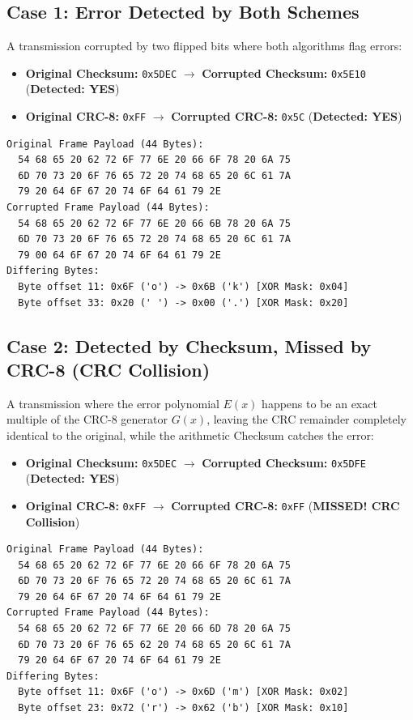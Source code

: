 \documentclass[11pt,a4paper]{article}
\begin{document}
\subsection{Case 1: Error Detected by Both Schemes}
A transmission corrupted by two flipped bits where both algorithms flag errors:
\begin{itemize}
    \item \textbf{Original Checksum:} \texttt{0x5DEC} $\longrightarrow$ \textbf{Corrupted Checksum:} \texttt{0x5E10} (\textbf{Detected: YES})
    \item \textbf{Original CRC-8:} \texttt{0xFF} $\longrightarrow$ \textbf{Corrupted CRC-8:} \texttt{0x5C} (\textbf{Detected: YES})
\end{itemize}
\begin{lstlisting}[style=hexstyle, caption={Case 1 Payload Hex Dumps and Differing Bytes}]
Original Frame Payload (44 Bytes):
  54 68 65 20 62 72 6F 77 6E 20 66 6F 78 20 6A 75 
  6D 70 73 20 6F 76 65 72 20 74 68 65 20 6C 61 7A 
  79 20 64 6F 67 20 74 6F 64 61 79 2E 
Corrupted Frame Payload (44 Bytes):
  54 68 65 20 62 72 6F 77 6E 20 66 6B 78 20 6A 75 
  6D 70 73 20 6F 76 65 72 20 74 68 65 20 6C 61 7A 
  79 00 64 6F 67 20 74 6F 64 61 79 2E 
Differing Bytes:
  Byte offset 11: 0x6F ('o') -> 0x6B ('k') [XOR Mask: 0x04]
  Byte offset 33: 0x20 (' ') -> 0x00 ('.') [XOR Mask: 0x20]
\end{lstlisting}

\subsection{Case 2: Detected by Checksum, Missed by CRC-8 (CRC Collision)}
A transmission where the error polynomial $E(x)$ happens to be an exact multiple of the CRC-8 generator $G(x)$, leaving the CRC remainder completely identical to the original, while the arithmetic Checksum catches the error:
\begin{itemize}
    \item \textbf{Original Checksum:} \texttt{0x5DEC} $\longrightarrow$ \textbf{Corrupted Checksum:} \texttt{0x5DFE} (\textbf{Detected: YES})
    \item \textbf{Original CRC-8:} \texttt{0xFF} $\longrightarrow$ \textbf{Corrupted CRC-8:} \texttt{0xFF} (\textbf{MISSED! CRC Collision})
\end{itemize}
\begin{lstlisting}[style=hexstyle, caption={Case 2 Payload Hex Dumps (CRC-8 Collision)}]
Original Frame Payload (44 Bytes):
  54 68 65 20 62 72 6F 77 6E 20 66 6F 78 20 6A 75 
  6D 70 73 20 6F 76 65 72 20 74 68 65 20 6C 61 7A 
  79 20 64 6F 67 20 74 6F 64 61 79 2E 
Corrupted Frame Payload (44 Bytes):
  54 68 65 20 62 72 6F 77 6E 20 66 6D 78 20 6A 75 
  6D 70 73 20 6F 76 65 62 20 74 68 65 20 6C 61 7A 
  79 20 64 6F 67 20 74 6F 64 61 79 2E 
Differing Bytes:
  Byte offset 11: 0x6F ('o') -> 0x6D ('m') [XOR Mask: 0x02]
  Byte offset 23: 0x72 ('r') -> 0x62 ('b') [XOR Mask: 0x10]
\end{lstlisting}
\end{document}
